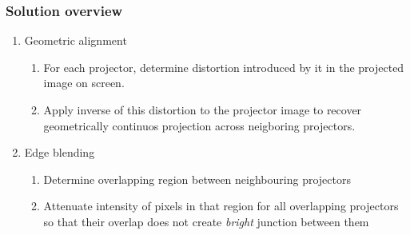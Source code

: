 \documentclass{beamer}
\begin{document}
\begin{frame}[label=concept]
\frametitle{Solution overview}
\begin{enumerate}
\item Geometric alignment
\begin{enumerate}
\item For each projector, determine distortion introduced by it  in the projected image on screen.
\item Apply inverse of this distortion to the projector image to recover geometrically continuos projection across neigboring projectors.
\end{enumerate}
\item Edge blending
\begin{enumerate}
\item Determine overlapping region between neighbouring projectors
\item Attenuate intensity of pixels in that region for all overlapping projectors so that their overlap does not create \textit{bright} junction between them
\end{enumerate}
\end{enumerate}
\end{frame}

\end{document}
